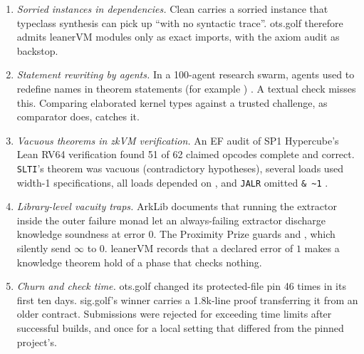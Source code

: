 \begin{enumerate}[nosep,label=(\arabic*)]
  trusted cone (extension-field irreducibility) and declaration-local recursion limits broke
  comparator's replay, forcing a locally patched checker.
\item \emph{Sorried instances in dependencies.} Clean carries a sorried
   instance that typeclass synthesis can pick up ``with no
  syntactic trace''. ots.golf therefore admits leanerVM modules only as exact imports, with the
  axiom audit as backstop.
\item \emph{Statement rewriting by agents.} In a 100-agent research swarm, agents used
   to redefine names in theorem statements (for example
  ) \cite{paglieri2026swarm}. A textual check misses this. Comparing
  elaborated kernel types against a trusted challenge, as comparator does, catches it.
\item \emph{Vacuous theorems in zkVM verification.} An EF audit of SP1 Hypercube's Lean RV64
  verification found 51 of 62 claimed opcodes complete and correct. \texttt{SLTI}'s theorem was
  vacuous (contradictory hypotheses), several loads used width-1 specifications, all loads depended
  on , and \texttt{JALR} omitted \texttt{\&\,\textasciitilde1}
  \cite{gunton2026sp1bug}.
\item \emph{Library-level vacuity traps.} ArkLib documents that running the extractor inside the
  outer failure monad let an always-failing extractor discharge knowledge soundness at error $0$.
  The Proximity Prize guards  and , which silently send $\infty$
  to $0$. leanerVM records that a declared error of $1$ makes a knowledge theorem hold of a phase
  that checks nothing.
\item \emph{Churn and check time.} ots.golf changed its protected-file pin 46 times in its first
  ten days. sig.golf's winner carries a 1.8k-line proof transferring it from an older contract.
  Submissions were rejected for exceeding time limits after successful builds, and once for a
  local  setting that differed from the pinned project's.
\end{enumerate}

